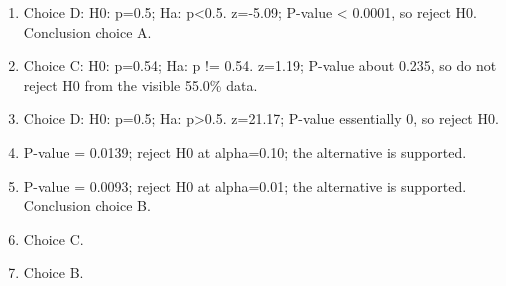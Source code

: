 \documentclass[11pt]{article}
\begin{document}
\begin{enumerate}[label=\textbf{\arabic*.}]
\item Choice D: H0: p=0.5; Ha: p<0.5. z=-5.09; P-value < 0.0001, so reject H0. Conclusion choice A.
\item Choice C: H0: p=0.54; Ha: p != 0.54. z=1.19; P-value about 0.235, so do not reject H0 from the visible 55.0\% data.
\item Choice D: H0: p=0.5; Ha: p>0.5. z=21.17; P-value essentially 0, so reject H0.
\item P-value = 0.0139; reject H0 at alpha=0.10; the alternative is supported.
\item P-value = 0.0093; reject H0 at alpha=0.01; the alternative is supported. Conclusion choice B.
\item Choice C.
\item Choice B.
\end{enumerate}
\end{document}
